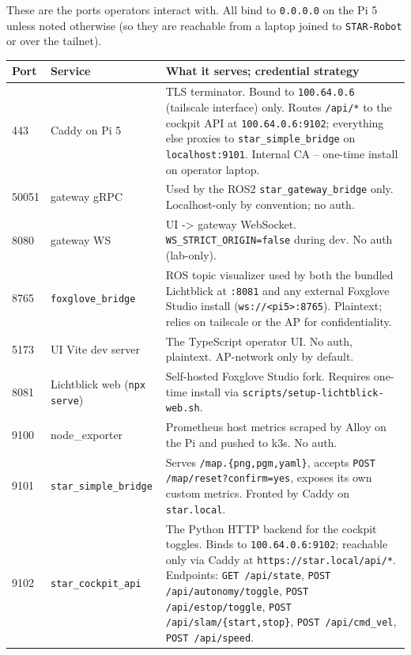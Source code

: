 These are the ports operators interact with. All bind to
\texttt{0.0.0.0} on the Pi 5 unless noted otherwise (so they are
reachable from a laptop joined to \texttt{STAR-Robot} or over the
tailnet).

\begin{center}
\begin{tabular}{|p{1.5cm}|p{4.4cm}|p{8.9cm}|}
\hline
\textbf{Port} & \textbf{Service} & \textbf{What it serves; credential strategy} \\
\hline
443  & Caddy on Pi 5 & TLS terminator. Bound to
\texttt{100.64.0.6} (tailscale interface) only.
Routes \texttt{/api/*} to the cockpit API at
\texttt{100.64.0.6:9102}; everything else proxies to
\texttt{star\_simple\_bridge} on \texttt{localhost:9101}. Internal
CA -- one-time install on operator laptop. \\
\hline
50051 & gateway gRPC & Used by the ROS2
\texttt{star\_gateway\_bridge} only. Localhost-only by convention;
no auth. \\
\hline
8080  & gateway WS & UI -> gateway WebSocket.
\texttt{WS\_STRICT\_ORIGIN=false} during dev. No auth (lab-only). \\
\hline
8765  & \texttt{foxglove\_bridge} & ROS topic visualizer used by
both the bundled Lichtblick at \texttt{:8081} and any external
Foxglove Studio install (\texttt{ws://<pi5>:8765}). Plaintext;
relies on tailscale or the AP for confidentiality. \\
\hline
5173  & UI Vite dev server & The TypeScript operator UI. No auth,
plaintext. AP-network only by default. \\
\hline
8081  & Lichtblick web (\texttt{npx serve}) & Self-hosted Foxglove
Studio fork. Requires one-time install via
\texttt{scripts/setup-lichtblick-web.sh}. \\
\hline
9100  & node\_exporter & Prometheus host metrics scraped by Alloy
on the Pi and pushed to k3s. No auth. \\
\hline
9101  & \texttt{star\_simple\_bridge} & Serves
\texttt{/map.\{png,pgm,yaml\}}, accepts
\texttt{POST /map/reset?confirm=yes}, exposes its own custom
metrics. Fronted by Caddy on \texttt{star.local}. \\
\hline
9102  & \texttt{star\_cockpit\_api} & The Python HTTP backend for
the cockpit toggles. Binds to \texttt{100.64.0.6:9102}; reachable
only via Caddy at \texttt{https://star.local/api/*}. Endpoints:
\texttt{GET /api/state}, \texttt{POST /api/autonomy/toggle},
\texttt{POST /api/estop/toggle},
\texttt{POST /api/slam/\{start,stop\}},
\texttt{POST /api/cmd\_vel}, \texttt{POST /api/speed}. \\
\hline
\end{tabular}
\end{center}

